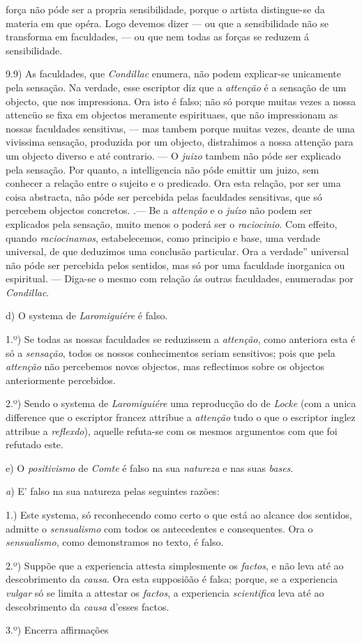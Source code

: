 força não póde ser a propria sensibilidade, porque o artista distingue-se da materia em que opéra. Logo devemos dizer --- ou que a sensibilidade não se transforma em faculdades, --- ou que nem todas as forças se reduzem á sensibilidade.\par 9.9) As faculdades, que \emph{Condillac} enumera, não podem explicar-se unicamente pela sensação. Na verdade, esse escriptor diz que a \emph{attenção} é a sensação de um objecto, que nos impressiona. Ora isto é falso; não só porque muitas vezes a nossa attencüo se fixa em objectos meramente espirituaes, que não impressionam as nossas faculdades sensitivas, --- mas tambem porque muitas vezes, deante de uma vivissima sensação, produzida por um objecto, distrahimos a nossa attenção para um objecto diverso e até contrario. --- O \emph{juizo} tambem não póde ser explicado pela sensação. Por quanto, a intelligencia não póde emittir um juizo, sem conhecer a relação entre o sujeito e o predicado. Ora esta relação, por ser uma coisa abstracta, não póde ser percebida pelas faculdades sensitivas, que só percebem objectos concretos. .--- Be a \emph{attenção} e o \emph{juízo} não podem ser explicados pela sensação, muito menos o poderá ser o \emph{raciocinio}. Com effeito, quando \emph{raciocinamos}, estabelecemos, como principio e base, uma verdade universal, de que deduzimos uma conclusão particular. Ora a verdade” universal não póde ser percebida pelos sentidos, mas só por uma faculdade inorganica ou espiritual. --- Diga-se o mesmo com relação ás outras faculdades, enumeradas por \emph{Condillac}.\par d) O systema de \emph{Laromiguiére} é falso.\par 1.º) Se todas as nossas faculdades se reduzissem a \emph{attenção}, como anteriora esta é só a \emph{sensação}, todos os nossos conhecimentos seriam sensitivos; pois que pela \emph{attenção} não percebemos novos objectos, mas reflectimos sobre os objectos anteriormente percebidos.\par 2.º) Sendo o systema de \emph{Laromiguiére} uma reproducção do de \emph{Locke} (com a unica difference que o escriptor francez attribue a \emph{attenção} tudo o que o escriptor inglez attribue a \emph{reflexdo}), aquelle refuta-se com os mesmos argumentos com que foi refutado este.\par e) O \emph{positivismo} de \emph{Comte} é falso na sua \emph{natureza} e nas suas \emph{bases}.\par \emph{a}) E' falso na sua natureza pelas seguintes razões:\par 1.) Este systema, só reconhecendo como certo o que está ao alcance dos sentidos, admitte o \emph{sensualismo} com todos os antecedentes e consequentes. Ora o \emph{sensualismo}, como demonstramos no texto, é falso.\par 2.º) Suppõe que a experiencia attesta simplesmente os \emph{factos}, e não leva até ao descobrimento da \emph{causa}. Ora esta supposiõão é falsa; porque, se a experiencia \emph{vulgar} só se limita a attestar os \emph{factos}, a experiencia \emph{scientifica} leva até ao descobrimento da \emph{causa} d'esses factos.\par 3.º) Encerra affirmações 